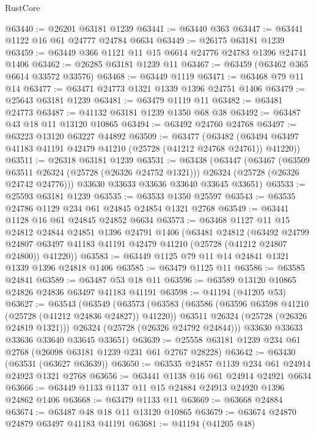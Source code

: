 \begin{lexlean}{RustCore}
\begin{coremodule}
@63440 := @26201 @63181 @1239
@63441 := @63440 @363
@63447 := @63441 @1122 @16 @61 @24777 @24784 @6634
@63449 := @26175 @63181 @1239
@63459 := @63449 @366 @1121 @11 @15 @6614 @24776 @24783 @1396 @24741 @1406
@63462 := @26285 @63181 @1239 @11
@63467 := @63459 (@63462 @365 @6614 @33572 @33576)
@63468 := @63449 @1119
@63471 := @63468 @79 @11 @14
@63477 := @63471 @24773 @1321 @1339 @1396 @24751 @1406
@63479 := @25643 @63181 @1239
@63481 := @63479 @1119 @11
@63482 := @63481 @24773
@63487 := @41132 @63181 @1239 @1350 @68 @38
@63492 := @63487 @43 @18 @11 @13120 @10865
@63494 := @63492 @24760 @24768
@63497 := @63223 @13120 @63227 @44892
@63509 := @63477
    (@63482 (@63494 @63497 @41183 @41191 @42479 @41210 (@25728 (@41212 @24768 @24761)) @41220))
@63511 := @26318 @63181 @1239
@63531 := @63438
    (@63447
      (@63467
        (@63509 @63511 @26324 (@25728 (@26326 @24752 @1321)))
        @26324
        (@25728 (@26326 @24742 @24776)))
      @33630
      @33633
      @33636
      @33640
      @33645
      @33651)
@63533 := @25593 @63181 @1239
@63535 := @63533 @1350 @25597
@63543 := @63535 @24786 @1129 @234 @61 @24845 @24854 @1321 @2768
@63549 := @63441 @1128 @16 @61 @24845 @24852 @6634
@63573 := @63468
    @1127
    @11
    @15
    @24812
    @24844
    @24851
    @1396
    @24791
    @1406
    (@63481
      @24812
      (@63492
        @24799
        @24807
        @63497
        @41183
        @41191
        @42479
        @41210
        (@25728 (@41212 @24807 @24800))
        @41220))
@63583 := @63449 @1125 @79 @11 @14 @24841 @1321 @1339 @1396 @24818 @1406
@63585 := @63479 @1125 @11
@63586 := @63585 @24841
@63589 := @63487 @53 @18 @11
@63596 := @63589 @13120 @10865 @24826 @24836 @63497 @41183 @41191
@63598 := @41194 (@41205 @53)
@63627 := @63543
    (@63549
      (@63573
        (@63583
          (@63586 (@63596 @63598 @41210 (@25728 (@41212 @24836 @24827)) @41220))
          @63511
          @26324
          (@25728 (@26326 @24819 @1321)))
        @26324
        (@25728 (@26326 @24792 @24844)))
      @33630
      @33633
      @33636
      @33640
      @33645
      @33651)
@63639 := @25558 @63181 @1239 @234 @61 @2768 (@26098 @63181 @1239 @231 @61 @2767 @28228)
@63642 := @63430 (@63531 (@63627 @63639))
@63650 := @63535 @24857 @1139 @234 @61 @24914 @24923 @1321 @2768
@63656 := @63441 @1138 @16 @61 @24914 @24921 @6634
@63666 := @63449 @1133 @1137 @11 @15 @24884 @24913 @24920 @1396 @24862 @1406
@63668 := @63479 @1133 @11
@63669 := @63668 @24884
@63674 := @63487 @48 @18 @11 @13120 @10865
@63679 := @63674 @24870 @24879 @63497 @41183 @41191
@63681 := @41194 (@41205 @48)

\end{coremodule}
\end{lexlean}
